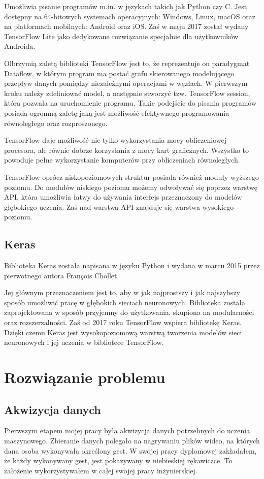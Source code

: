 \documentclass[a4paper,12pt,twoside,openany]{report}
\begin{document}
Umożliwia pisanie programów m.in. w językach takich jak Python czy C. Jest dostępny na 64-bitowych systemach operacyjnych: Windows, Linux, macOS oraz na platformach mobilnych: Android oraz iOS. Zaś w maju 2017 został wydany TensorFlow Lite jako dedykowane rozwiązanie specjalnie dla użytkowników Androida\cite{tensorflowlite}.

Olbrzymią zaletą biblioteki TensorFlow jest to, że reprezentuje on paradygmat Dataflow, w którym program ma postać grafu skierowanego modelującego przepływ danych pomiędzy niezależnymi operacjami w węzłach. W pierwszym kroku należy zdefiniować model, a następnie stworzyć tzw. TensorFlow session, która pozwala na uruchomienie programu. Takie podejście do pisania programów posiada ogromną zaletę jaką jest możliwość efektywnego programowania równoległego oraz rozproszonego\cite{tensorflowG}. 

TensorFlow daje możliwość nie tylko wykorzystania mocy obliczeniowej procesora, ale równie dobrze korzystania z mocy kart graficznych. Wszystko to powoduje pełne wykorzystanie komputerów przy obliczeniach równoległych.

TensorFlow oprócz niskopoziomowych struktur posiada również moduły wyższego poziomu. Do modułów niskiego poziomu możemy odwoływać się poprzez warstwę API, która umożliwia łatwy do używania interfejs przeznaczony do modelów głębokiego uczenia. Zaś nad warstwą API znajduje się warstwa wysokiego poziomu.

\section{Keras}
Biblioteka Keras została napisana w języku Python i wydana w marcu 2015 przez pierwotnego autora François Chollet\cite{keras}. 

Jej głównym przeznaczeniem jest to, aby w jak najprostszy i  jak najszybszy sposób umożliwić pracę w głębokich sieciach neuronowych. Biblioteka została zaprojektowana w sposób przyjemny do użytkowania, skupiona na modularności oraz rozszerzalności. Zaś od 2017 roku TensorFlow wspiera bibliotekę Keras. Dzięki czemu Keras jest wysokopoziomową warstwą tworzenia modelów sieci neuronowych i jej uczenia w bibliotece TensorFlow.

\chapter{Rozwiązanie problemu}
\section{Akwizycja danych}
Pierwszym etapem mojej pracy była akwizycja danych potrzebnych do uczenia maszynowego. Zbieranie danych polegało na nagrywaniu plików wideo, na których dana osoba wykonywała określony gest. W swojej pracy dyplomowej zakładałem, że każdy wykonywany gest, jest pokazywany w niebieskiej rękawiczce. To założenie wykorzystywałem w całej swojej pracy inżynierskiej.
\end{document}
